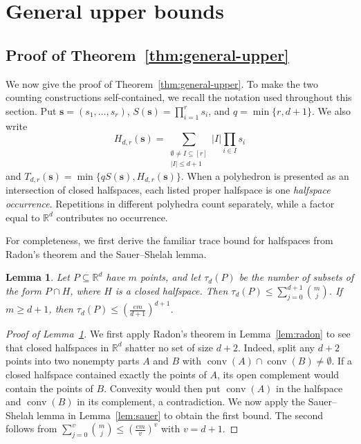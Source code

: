 \documentclass[11pt]{article}
\newtheorem{lemma}[theorem]{Lemma}
\theoremstyle{definition}
\newcommand*{\abs}[1]{\lvert#1\rvert}
\newcommand{\R}{\mathbb{R}}
\begin{document}
\section{General upper bounds}
\subsection{Proof of Theorem~\ref{thm:general-upper}}
We now give the proof of Theorem~\ref{thm:general-upper}. To make the two counting constructions self-contained, we recall the notation used throughout this section. Put \(\boldsymbol{s}=(s_{1},\ldots,s_{r})\), \(S(\boldsymbol{s})=\prod_{i=1}^{r}s_{i}\), and \(q=\min\{r,d+1\}\). We also write
\[
H_{d,r}(\boldsymbol{s})=\sum_{\substack{\emptyset\ne I\subseteq[r]\\\abs{I}\le d+1}}\abs{I}\prod_{i\in I}s_{i}
\]
and \(T_{d,r}(\boldsymbol{s})=\min\{qS(\boldsymbol{s}),H_{d,r}(\boldsymbol{s})\}\). When a polyhedron is presented as an intersection of closed halfspaces, each listed proper halfspace is one \emph{halfspace occurrence}. Repetitions in different polyhedra count separately, while a factor equal to \(\R^{d}\) contributes no occurrence.

For completeness, we first derive the familiar trace bound for halfspaces from Radon's theorem and the Sauer--Shelah lemma.

\begin{lemma}\label{lem:halfspace-subsets}
Let \(P\subseteq\R^{d}\) have \(m\) points, and let \(\tau_{d}(P)\) be the number of subsets of the form \(P\cap H\), where \(H\) is a closed halfspace. Then \(\tau_{d}(P)\le\sum_{j=0}^{d+1}\binom{m}{j}\). If \(m\ge d+1\), then \(\tau_{d}(P)\le \left(\frac{em}{d+1}\right)^{d+1}\).
\end{lemma}
\begin{proof}[Proof of Lemma~\ref{lem:halfspace-subsets}]
We first apply Radon's theorem in Lemma~\ref{lem:radon} to see that closed halfspaces in \(\R^{d}\) shatter no set of size \(d+2\). Indeed, split any \(d+2\) points into two nonempty parts \(A\) and \(B\) with \(\operatorname{conv}(A)\cap\operatorname{conv}(B)\ne\emptyset\). If a closed halfspace contained exactly the points of \(A\), its open complement would contain the points of \(B\). Convexity would then put \(\operatorname{conv}(A)\) in the halfspace and \(\operatorname{conv}(B)\) in its complement, a contradiction. We now apply the Sauer--Shelah lemma in Lemma~\ref{lem:sauer} to obtain the first bound. The second follows from \(\sum_{j=0}^{v}\binom{m}{j}\le \left(\frac{em}{v}\right)^{v}\) with \(v=d+1\).
\end{proof}
\end{document}
